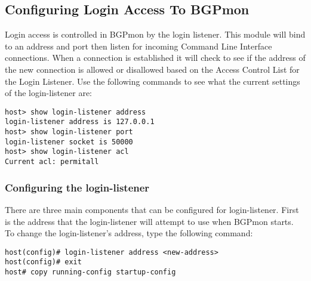 \subsection{Configuring Login Access To BGPmon }
\label{sec:configure:cli}

Login access is controlled in BGPmon by the login listener.  This module will bind to an address and port then listen for incoming Command Line Interface connections.  When a connection is established it will check to see if the address of the new connection is allowed or disallowed based on the Access Control List for the Login Listener.  Use the following commands to see what the current settings of the login-listener are: \\

\begin{Verbatim}[frame=single]
host> show login-listener address
login-listener address is 127.0.0.1
host> show login-listener port
login-listener socket is 50000
host> show login-listener acl
Current acl: permitall
\end{Verbatim}
%
%


\subsubsection{Configuring the login-listener}
\label{sec:configure:login:login-listener}

There are three main components that can be configured for login-listener.
First is the address that the login-listener will attempt to use when BGPmon starts.
To change the login-listener's address, type the following command:\\

\begin{Verbatim}[frame=single]
host(config)# login-listener address <new-address>
host(config)# exit
host# copy running-config startup-config
\end{Verbatim}

